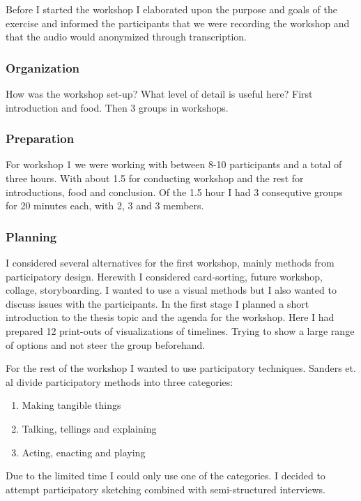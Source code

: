 \documentclass[11pt,UKenglish, a4paper]{article}
\begin{document}
Before I started the workshop I elaborated upon the purpose and goals of the exercise and informed the participants that we were recording the workshop and that the audio would anonymized through transcription. 

\subsubsection{Organization}
How was the workshop set-up? What level of detail is useful here?
First introduction and food.
Then 3 groups in workshops. 

\subsubsection{Preparation}
For workshop 1 we were working with between 8-10 participants and a total of three hours. With about 1.5 for conducting workshop and the rest for introductions, food and conclusion. Of the 1.5 hour I had 3 consequtive groups for 20 minutes each, with 2, 3 and 3 members. 

\subsubsection{Planning}
I considered several alternatives for the first workshop, mainly methods from participatory design. Herewith I considered card-sorting, future workshop, collage, storyboarding. I wanted to use a visual methods but I also wanted to discuss issues with the participants. In the first stage I planned a short introduction to the thesis topic and the agenda for the workshop. Here I had prepared 12 print-outs of visualizations of timelines. Trying to show a large range of options and not steer the group beforehand. 

For the rest of the workshop I wanted to use participatory techniques. Sanders et. al divide participatory methods into three categories:

\begin{enumerate}[label=\bfseries\arabic*]
\item{Making tangible things}
\item{Talking, tellings and explaining}
\item{Acting, enacting and playing} 
\cite[p.2]{Sanders2010Framework}
\end{enumerate}

Due to the limited time I could only use one of the categories. I decided to attempt participatory sketching combined with semi-structured interviews.
\end{document}
